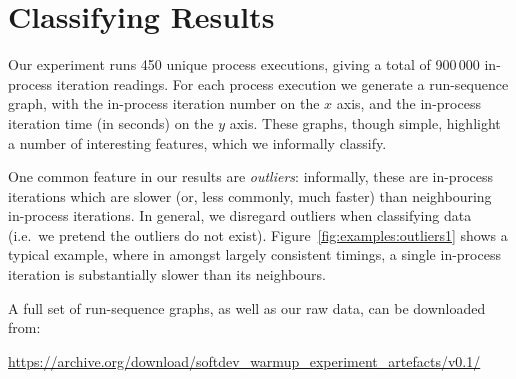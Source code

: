 \documentclass[a4paper,UKenglish]{lipics}
\begin{document}
\section{Classifying Results}
\label{sec:Results}

Our experiment runs 450 unique process executions, giving a total of 900\,000
in-process iteration readings. For each process execution we generate a
run-sequence graph, with the in-process iteration number on the $x$ axis, and the
in-process iteration time (in seconds) on the $y$ axis.
These graphs, though simple, highlight a number of
interesting features, which we informally classify.

One common feature in our results are \emph{outliers}: informally, these are
in-process iterations which are slower (or, less commonly, much
faster) than neighbouring in-process iterations. In general, we disregard outliers
when classifying data (i.e.~we pretend the outliers do not exist). Figure~\ref{fig:examples:outliers1}
shows a typical
example, where in amongst largely consistent timings, a single in-process
iteration is substantially slower than its neighbours.

A full set of run-sequence graphs, as well as our raw data, can be downloaded from:
\vspace{-.5em}
\begin{center}
{\small%
\url{https://archive.org/download/softdev_warmup_experiment_artefacts/v0.1/}
}
\end{center}
\end{document}
